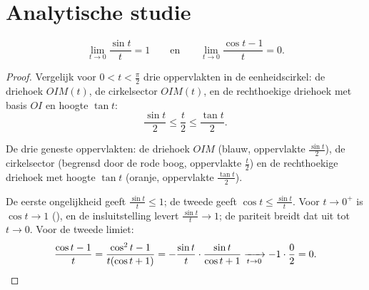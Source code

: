 \section{Analytische studie}

\begin{lemma}\label{lem:g12:trigo:sinxx}
\[
\lim_{t \to 0} \frac{\sin t}{t} = 1
\qquad\text{en}\qquad
\lim_{t \to 0} \frac{\cos t - 1}{t} = 0 .
\]
\end{lemma}

\begin{proof}
Vergelijk voor $0 < t < \frac{\pi}{2}$ drie oppervlakten in de
eenheidscirkel: de driehoek $OIM(t)$, de cirkelsector $OIM(t)$, en de
rechthoekige driehoek met basis $OI$ en hoogte $\tan t$:
\[
\frac{\sin t}{2} \leq \frac{t}{2} \leq \frac{\tan t}{2}.
\]

\begin{omfigure}

{\small De drie geneste oppervlakten: de driehoek $OIM$ (blauw, oppervlakte
$\frac{\sin t}{2}$), de cirkelsector (begrensd door de rode boog, oppervlakte
$\frac{t}{2}$) en de rechthoekige driehoek met hoogte $\tan t$ (oranje,
oppervlakte $\frac{\tan t}{2}$).}
\end{omfigure}

De eerste ongelijkheid geeft $\frac{\sin t}{t} \leq 1$; de tweede geeft
$\cos t \leq \frac{\sin t}{t}$. Voor $t \to 0^+$ is $\cos t \to 1$
(), en de insluitstelling levert $\frac{\sin t}{t} \to 1$; de
pariteit breidt dat uit tot $t \to 0$. Voor de tweede limiet:
\[
\frac{\cos t - 1}{t} = \frac{\cos^2 t - 1}{t(\cos t + 1)}
= -\frac{\sin t}{t}\cdot\frac{\sin t}{\cos t + 1}
\xrightarrow[t\to0]{} -1 \cdot \frac{0}{2} = 0. \qedhere
\]
\end{proof}

